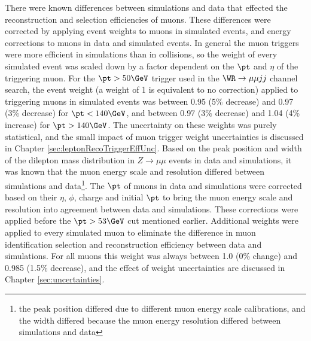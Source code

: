 There were known differences between simulations and data that effected the reconstruction and selection efficiencies 
of muons.  These differences were corrected by applying event weights to muons in simulated events, and energy 
corrections to muons in data and simulated events.  In general the muon triggers were more efficient in simulations than in 
collisions, so the weight of every simulated event was scaled down by a factor dependent on the $\pt$ and $\eta$ of the 
triggering muon.  For the $\pt > 50 \GeV$ trigger used in the $\WR \rightarrow \mu\mu jj$ channel search, the 
event weight (a weight of 1 is equivalent to no correction) applied to triggering muons in simulated events was between 
0.95 (5\% decrease) and 0.97 (3\% decrease) for $\pt < 140 \GeV$, and between 0.97 (3\% decrease) and 1.04 (4\% increase) for $\pt > 140 \GeV$.  
The uncertainty on these weights was purely statistical, and the small impact of muon trigger weight uncertainties is discussed in 
Chapter \ref{sec:leptonRecoTriggerEffUnc}.  Based on the peak position and width of the dilepton mass distribution in $Z \rightarrow \mu\mu$ 
events in data and simulations, it was known that the muon energy scale and resolution differed between simulations 
and data\footnote{the peak position differed due to different muon energy scale calibrations, and the width differed 
because the muon energy resolution differed between simulations and data}.  The $\pt$ of muons in data and simulations 
were corrected based on their $\eta$, $\phi$, charge and initial $\pt$ to bring the muon energy scale and resolution 
into agreement between data and simulations.  These corrections were applied 
before the $\pt > 53 \GeV$ cut mentioned earlier.  Additional weights were applied to every simulated muon 
to eliminate the difference in muon identification selection and reconstruction efficiency between data and simulations.  
For all muons this weight was always between 1.0 (0\% change) and 0.985 (1.5\% decrease), and the effect of weight uncertainties 
are discussed in Chapter \ref{sec:uncertainties}.

